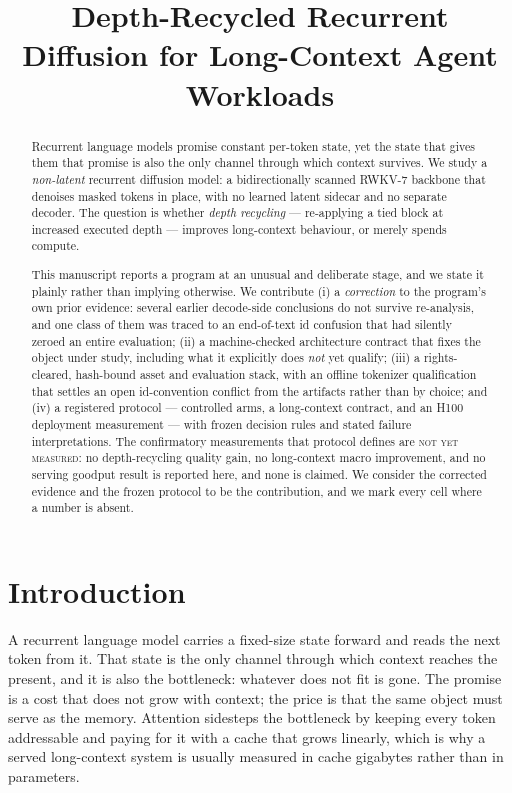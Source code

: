 \documentclass[11pt]{article}
\title{Depth-Recycled Recurrent Diffusion for Long-Context Agent Workloads}
\author{}
\date{}
\newcommand{\notrun}{\textsc{not yet measured}}
\begin{document}
\maketitle

\begin{abstract}
Recurrent language models promise constant per-token state, yet the state that gives
them that promise is also the only channel through which context survives. We study a
\emph{non-latent} recurrent diffusion model: a bidirectionally scanned RWKV-7 backbone
that denoises masked tokens in place, with no learned latent sidecar and no separate
decoder. The question is whether \emph{depth recycling} --- re-applying a tied block at
increased executed depth --- improves long-context behaviour, or merely spends compute.

This manuscript reports a program at an unusual and deliberate stage, and we state it
plainly rather than implying otherwise. We contribute (i) a \emph{correction} to the
program's own prior evidence: several earlier decode-side conclusions do not survive
re-analysis, and one class of them was traced to an end-of-text id confusion that had
silently zeroed an entire evaluation; (ii) a machine-checked architecture contract that
fixes the object under study, including what it explicitly does \emph{not} yet qualify;
(iii) a rights-cleared, hash-bound asset and evaluation stack, with an offline
tokenizer qualification that settles an open id-convention conflict from the artifacts
rather than by choice; and (iv) a registered protocol --- controlled arms, a long-context
contract, and an H100 deployment measurement --- with frozen decision rules and stated
failure interpretations. The confirmatory measurements that protocol defines are
\notrun{}: no depth-recycling quality gain, no long-context macro improvement, and no
serving goodput result is reported here, and none is claimed. We consider the corrected
evidence and the frozen protocol to be the contribution, and we mark every cell where a
number is absent.
\end{abstract}

\section{Introduction}

A recurrent language model carries a fixed-size state forward and reads the next token
from it. That state is the only channel through which context reaches the present, and it
is also the bottleneck: whatever does not fit is gone. The promise is a cost that does not
grow with context; the price is that the same object must serve as the memory. Attention
sidesteps the bottleneck by keeping every token addressable and paying for it with a cache
that grows linearly, which is why a served long-context system is usually measured in cache
gigabytes rather than in parameters.
\end{document}
